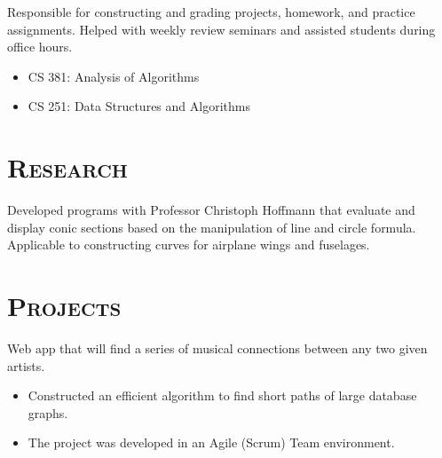 \begin{resume}
  \begin{position}
    Responsible for constructing and grading projects, homework, and practice assignments. Helped with weekly review seminars and assisted students during office hours.
    \begin{itemize}
      \setlength\itemsep{0em}
      \item CS 381: Analysis of Algorithms
      \item CS 251: Data Structures and Algorithms
    \end{itemize}
  \end{position}

  \section{\textsc{Research}}

  \begin{position}
    Developed programs with Professor Christoph Hoffmann that evaluate and display conic sections based on the manipulation of line and circle formula. Applicable to constructing curves for airplane wings and fuselages.
  \end{position}

  \section{\textsc{Projects}}

  \begin{position}
    Web app that will find a series of musical connections between any two given artists. 
    \begin{itemize}
      \setlength\itemsep{0em}
      \item Constructed an efficient algorithm to find short paths of large database graphs.
      \item The project was developed in an Agile (Scrum) Team environment.
    \end{itemize}
  \end{position}


\end{resume}
